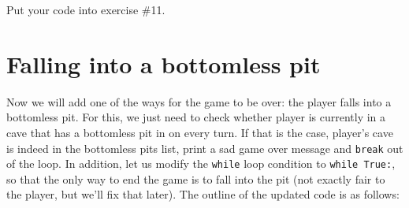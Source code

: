 \documentclass[
]{book}
\begin{document}
Put your code into exercise \#11.

\hypertarget{falling-into-a-bottomless-pit}{%
\section{Falling into a bottomless pit}\label{falling-into-a-bottomless-pit}}

Now we will add one of the ways for the game to be over: the player falls into a bottomless pit. For this, we just need to check whether player is currently in a cave that has a bottomless pit in on every turn. If that is the case, player's cave is indeed in the bottomless pits list, print a sad game over message and \texttt{break} out of the loop. In addition, let us modify the \texttt{while} loop condition to \texttt{while\ True:}, so that the only way to end the game is to fall into the pit (not exactly fair to the player, but we'll fix that later). The outline of the updated code is as follows:
\end{document}
